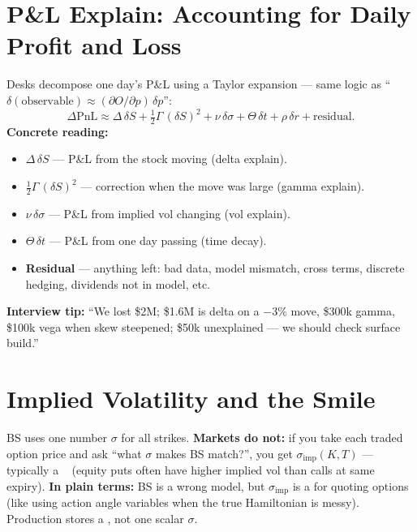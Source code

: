 \section{P\&L Explain: Accounting for Daily Profit and Loss}
\label{sec:pnl-explain}
Desks decompose one day's P\&L using a Taylor expansion --- same logic as 
``$\delta(\mathrm{observable}) \approx (\partial O/\partial p)\,\delta p$'':
\begin{equation}
  \Delta \mathrm{PnL} \approx
  \Delta\,\delta S
  + \tfrac{1}{2}\Gamma\,(\delta S)^2
  + \nu\,\delta\sigma
  + \Theta\,\delta t
  + \rho\,\delta r
  + \text{residual} .
  \label{eq:pnl-explain}
\end{equation}
\textbf{Concrete reading:}
\begin{itemize}
    \item $\Delta\,\delta S$ --- P\&L from the stock moving (delta explain).
    \item $\tfrac{1}{2}\Gamma\,(\delta S)^2$ --- correction when the move was large 
          (gamma explain).
    \item $\nu\,\delta\sigma$ --- P\&L from implied vol changing (vol explain).
    \item $\Theta\,\delta t$ --- P\&L from one day passing (time decay).
    \item \textbf{Residual} --- anything left: bad data, model mismatch, cross terms, 
          discrete hedging, dividends not in model, etc.
\end{itemize}
\par\noindent\textbf{Interview tip:} ``We lost \$2M; \$1.6M is delta on a $-3\%$ move, 
\$300k gamma, \$100k vega when skew steepened; \$50k unexplained --- we should check 
surface build.''

\section{Implied Volatility and the Smile}
\label{sec:implied-vol-smile}
BS uses one number $\sigma$ for all strikes. \textbf{Markets do not:} if you take 
each traded option price and ask ``what $\sigma$ makes BS match?'', you get 
 $\sigma_{\mathrm{imp}}(K,T)$ --- typically a 
~\cite{wiki-volatility-smile} (equity puts often have higher 
implied vol than calls at same expiry).
\newline
\textbf{In plain terms:} BS is a wrong model, but $\sigma_{\mathrm{imp}}$ is a 
 for quoting options (like using action angle variables 
when the true Hamiltonian is messy). Production stores a , 
not one scalar $\sigma$.


